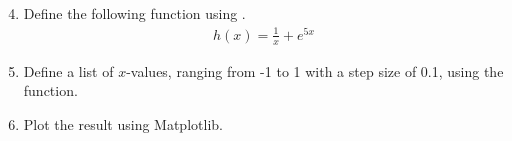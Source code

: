 \documentclass{article}
\begin{document}
%
%
%
%
%
%
%



\begin{enumerate}
  \setcounter{enumi}{3}
  \item Define the following function using .
    \begin{align}
        h(x) = \frac{1}{x} + e^{5x}
    \end{align}

  \item Define a list of $x$-values, ranging from -1 to 1 with a step size of 0.1, using the  function.

  \item Plot the result using Matplotlib.

\end{enumerate}
\end{document}
